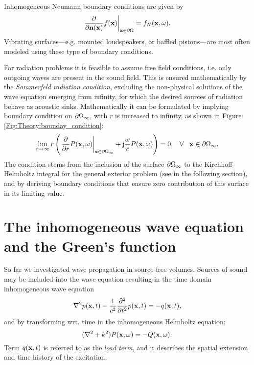 \begin{itemize}
Inhomogeneous Neumann boundary conditions are given by
\begin{equation}
\left. \frac{\partial}{\partial \mathbf{n}(\mathbf{x})} f(\mathbf{x}) \right|_{\mathbf{x} \in \partial \Omega}= f_N(\mathbf{x},\omega).
\end{equation}
Vibrating surfaces---e.g. mounted loudspeakers, or baffled pistons---are most often modeled using these type of boundary conditions.
\end{itemize}

For radiation problems it is feasible to assume free field conditions, i.e. only outgoing waves are present in the sound field. This is ensured mathematically by the \emph{Sommerfeld radiation condition}, excluding the non-physical solutions of the wave equation emerging from infinity, for which the desired sources of radiation behave as acoustic sinks.
Mathematically it can be formulated by implying boundary condition on $\partial \Omega_{\infty}$, with $r$ is increased to infinity, as shown in Figure \ref{Fig:Theory:bounday_condition}:
\begin{equation}
\lim_{r \rightarrow \infty} r \left( \left. \frac{\partial}{\partial r}P(\mathbf{x},\omega)\right|_{\mathbf{x} \in \partial \Omega_{\infty}} +\mathrm{j} \frac{\omega}{c}P(\mathbf{x},\omega) \right) = 0, \hspace{3mm} \forall \hspace{3mm} \mathbf{x} \in \partial \Omega_{\infty}.
\label{Eq:Theory:Sommerfeld_radiation_condition}
\end{equation}
The condition stems from the inclusion of the surface $\partial \Omega_{\infty}$ to the Kirchhoff-Helmholtz integral for the general exterior problem (see in the following section), and by deriving boundary conditions that ensure zero contribution of this surface in its limiting value\cite{Schot1992:Eighty_years, Williams1999}.

\newpage
\section{The inhomogeneous wave equation and the Green's function}

So far we investigated wave propagation in source-free volumes. Sources of sound may be included into the wave equation resulting in the time domain inhomogeneous wave equation
\begin{equation}
\nabla^2 p(\mathbf{x},t) -\frac{1}{c^2}\frac{\partial^2}{\partial t^2}p(\mathbf{x},t) = -q(\mathbf{x},t),
\label{Eq:Theory:Inhomogene_wave_eq_time_domain}
\end{equation}
and by transforming wrt. time in the inhomogeneous Helmholtz equation:
\begin{equation}
(\nabla^2 + k^2 ) P(\mathbf{x},\omega ) = -Q(\mathbf{x},\omega).
\end{equation}
Term $q(\mathbf{x},t)$ is referred to as the \emph{load term}, and it describes the spatial extension and time history of the excitation.

